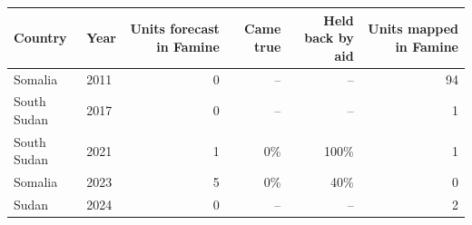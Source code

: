 \begin{tabular}{llrrrr}
\toprule
Country & Year & Units forecast in Famine & Came true & Held back by aid & Units mapped in Famine \\
\midrule
Somalia & 2011 & 0 & -- & -- & 94 \\
South Sudan & 2017 & 0 & -- & -- & 1 \\
South Sudan & 2021 & 1 & 0\% & 100\% & 1 \\
Somalia & 2023 & 5 & 0\% & 40\% & 0 \\
Sudan & 2024 & 0 & -- & -- & 2 \\
\bottomrule
\end{tabular}

